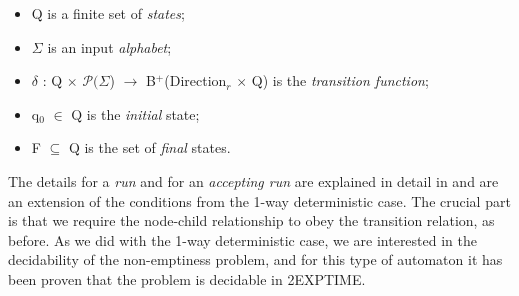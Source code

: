 \documentclass[11pt, a4paper, dvipsnames]{article}
\begin{document}
\begin{itemize}
	\item Q is a finite set of \textit{states};
	\item $\Sigma$ is an input \textit{alphabet};
	\item $\delta$ : Q $\times$ $\mathcal{P}(\Sigma$) $\rightarrow$ B$^{+}$(Direction$_{r}$ $\times$ Q) is the \textit{transition function};
	\item q$_{0}$ $\in$ Q is the \textit{initial} state;
	\item F $\subseteq$ Q is the set of \textit{final} states.
\end{itemize}
The details for a \textit{run} and for an \textit{accepting run} are explained in detail in \cite{decidable} and are an extension of the conditions from the 1-way deterministic case. The crucial part is that we require the node-child relationship to obey the transition relation, as before. As we did with the 1-way deterministic case, we are interested in the decidability of the non-emptiness problem, and for this type of automaton it has been proven that the problem is decidable in 2EXPTIME.
\end{document}
